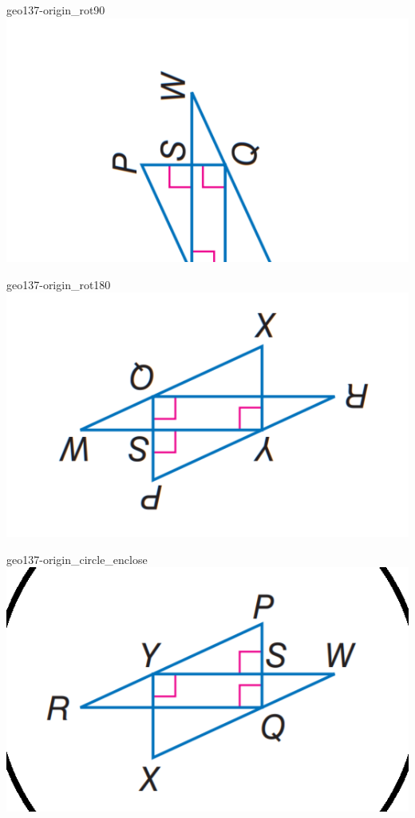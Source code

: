 \documentclass[12pt]{article}
\begin{document}
\begin{center}
\begin{minipage}{0.32\textwidth}
\end{minipage}
\hfill\begin{minipage}{0.32\textwidth}\centering
geo137-origin\_rot90\\
\includegraphics[width=0.95\linewidth]{out_rommath_origin/items/geo137-origin/assets/figure_rot90.png}
\end{minipage}
\par\medskip
\begin{minipage}{0.32\textwidth}\centering
geo137-origin\_rot180\\
\includegraphics[width=0.95\linewidth]{out_rommath_origin/items/geo137-origin/assets/figure_rot180.png}
\end{minipage}
\hfill\begin{minipage}{0.32\textwidth}\centering
geo137-origin\_circle\_enclose\\
\includegraphics[width=0.95\linewidth]{out_rommath_origin/items/geo137-origin/assets/figure_circle.png}
\end{minipage}
\par
\end{center}
\end{document}
